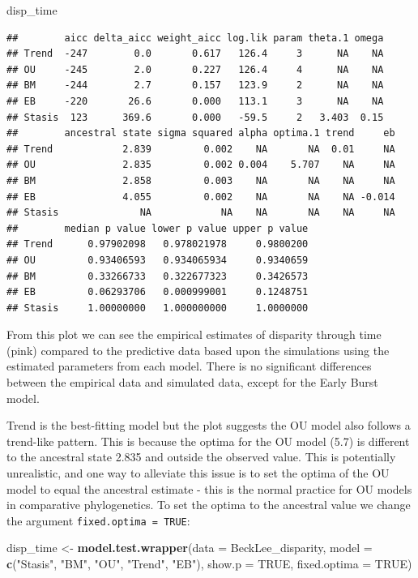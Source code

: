 \documentclass[]{book}
\newenvironment{Shaded}{\begin{snugshade}}{\end{snugshade}}
\newcommand{\KeywordTok}[1]{\textcolor[rgb]{0.13,0.29,0.53}{\textbf{#1}}}
\newcommand{\DataTypeTok}[1]{\textcolor[rgb]{0.13,0.29,0.53}{#1}}
\newcommand{\StringTok}[1]{\textcolor[rgb]{0.31,0.60,0.02}{#1}}
\newcommand{\OtherTok}[1]{\textcolor[rgb]{0.56,0.35,0.01}{#1}}
\newcommand{\NormalTok}[1]{#1}
\theoremstyle{definition}
\theoremstyle{definition}
\theoremstyle{definition}
\theoremstyle{remark}
\begin{document}
\begin{Shaded}
\begin{Highlighting}[]
\NormalTok{disp_time}
\end{Highlighting}
\end{Shaded}

\begin{verbatim}
##        aicc delta_aicc weight_aicc log.lik param theta.1 omega
## Trend  -247        0.0       0.617   126.4     3      NA    NA
## OU     -245        2.0       0.227   126.4     4      NA    NA
## BM     -244        2.7       0.157   123.9     2      NA    NA
## EB     -220       26.6       0.000   113.1     3      NA    NA
## Stasis  123      369.6       0.000   -59.5     2   3.403  0.15
##        ancestral state sigma squared alpha optima.1 trend     eb
## Trend            2.839         0.002    NA       NA  0.01     NA
## OU               2.835         0.002 0.004    5.707    NA     NA
## BM               2.858         0.003    NA       NA    NA     NA
## EB               4.055         0.002    NA       NA    NA -0.014
## Stasis              NA            NA    NA       NA    NA     NA
##        median p value lower p value upper p value
## Trend      0.97902098   0.978021978     0.9800200
## OU         0.93406593   0.934065934     0.9340659
## BM         0.33266733   0.322677323     0.3426573
## EB         0.06293706   0.000999001     0.1248751
## Stasis     1.00000000   1.000000000     1.0000000
\end{verbatim}

From this plot we can see the empirical estimates of disparity through
time (pink) compared to the predictive data based upon the simulations
using the estimated parameters from each model. There is no significant
differences between the empirical data and simulated data, except for
the Early Burst model.

Trend is the best-fitting model but the plot suggests the OU model also
follows a trend-like pattern. This is because the optima for the OU
model (5.7) is different to the ancestral state 2.835 and outside the
observed value. This is potentially unrealistic, and one way to
alleviate this issue is to set the optima of the OU model to equal the
ancestral estimate - this is the normal practice for OU models in
comparative phylogenetics. To set the optima to the ancestral value we
change the argument \texttt{fixed.optima\ =\ TRUE}:

\begin{Shaded}
\begin{Highlighting}[]
\NormalTok{disp_time <-}\StringTok{ }\KeywordTok{model.test.wrapper}\NormalTok{(}\DataTypeTok{data =}\NormalTok{ BeckLee_disparity, }\DataTypeTok{model =} \KeywordTok{c}\NormalTok{(}\StringTok{"Stasis"}\NormalTok{, }\StringTok{"BM"}\NormalTok{, }\StringTok{"OU"}\NormalTok{, }\StringTok{"Trend"}\NormalTok{, }\StringTok{"EB"}\NormalTok{),}
                                \DataTypeTok{show.p =} \OtherTok{TRUE}\NormalTok{, }\DataTypeTok{fixed.optima =} \OtherTok{TRUE}\NormalTok{)}
\end{Highlighting}
\end{Shaded}
\end{document}
